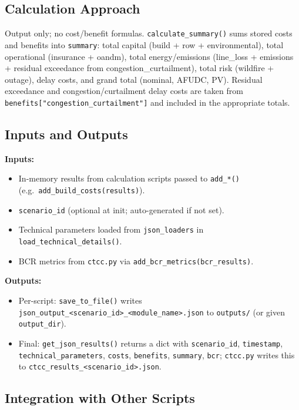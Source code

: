 \documentclass[ctcc_full_documentation.tex]{subfiles}
\begin{document}
\subsection{Calculation Approach}

Output only; no cost/benefit formulas. \texttt{calculate\_summary()} sums stored costs and benefits into \texttt{summary}: total capital (build + row + environmental), total operational (insurance + oandm), total energy/emissions (line\_loss + emissions + residual exceedance from congestion\_curtailment), total risk (wildfire + outage), delay costs, and grand total (nominal, AFUDC, PV). Residual exceedance and congestion/curtailment delay costs are taken from \texttt{benefits["congestion\_curtailment"]} and included in the appropriate totals.

\subsection{Inputs and Outputs}

\textbf{Inputs:}
\begin{itemize}
    \item In-memory results from calculation scripts passed to \texttt{add\_*()} (e.g.\ \texttt{add\_build\_costs(results)}).
    \item \texttt{scenario\_id} (optional at init; auto-generated if not set).
    \item Technical parameters loaded from \texttt{json\_loaders} in \texttt{load\_technical\_details()}.
    \item BCR metrics from \texttt{ctcc.py} via \texttt{add\_bcr\_metrics(bcr\_results)}.
\end{itemize}

\textbf{Outputs:}
\begin{itemize}
    \item Per-script: \texttt{save\_to\_file()} writes \texttt{json\_output\_<scenario\_id>\_<module\_name>.json} to \texttt{outputs/} (or given \texttt{output\_dir}).
    \item Final: \texttt{get\_json\_results()} returns a dict with \texttt{scenario\_id}, \texttt{timestamp}, \texttt{technical\_parameters}, \texttt{costs}, \texttt{benefits}, \texttt{summary}, \texttt{bcr}; \texttt{ctcc.py} writes this to \texttt{ctcc\_results\_<scenario\_id>.json}.
\end{itemize}

\subsection{Integration with Other Scripts}
\end{document}
